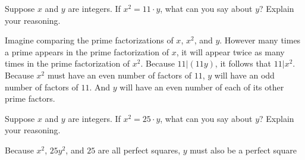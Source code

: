 \documentclass[nooutcomes]{ximera}
\begin{document}
\begin{problem}
Suppose $x$ and $y$ are integers.  If $x^2 = 11\cdot y$, what can you say about $y$? Explain your
  reasoning.
\begin{freeResponse}
\begin{hint}
Imagine comparing the prime factorizations of $x$, $x^2$, and $y$.  However many times a prime appears in the prime factorization of $x$, it will appear twice as many times in the prime factorization of $x^2$.  Because $11|(11y)$, it follows that $11|x^2$.  Because $x^2$ must have an even number of factors of $11$, $y$ will have an odd number of factors of $11$.  And $y$ will have an even number of each of its other prime factors.  
\end{hint}
\end{freeResponse}
\end{problem}

\begin{problem}
Suppose $x$ and $y$ are integers.  If $x^2 = 25\cdot y$, what can you say about $y$? Explain your
  reasoning.
\begin{freeResponse}
\begin{hint}
Because $x^2$, $25y^2$, and $25$ are all perfect squares, $y$ must also be a perfect square 
\end{hint}
\end{freeResponse}
\end{problem}

\end{document}
